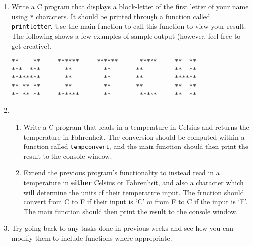 \documentclass{pass}
\begin{document}
\begin{enumerate}[resume]
\item Write a C program that displays a block-letter of the first letter of your name using \texttt{*} characters. It should be printed through a function called \texttt{print\textunderscore letter}. Use the main function to call this function to view your result. The following shows a few examples of sample output (however, feel free to get creative).
\begin{lstlisting}[style=CStyle]
**    **     ******     ******      *****     **  **
***  ***       **         **       **         **  **
********       **         **       **         ******
** ** **       **         **       **         **  **
** ** **     ******       **        *****     **  **
\end{lstlisting}
\item
	\begin{enumerate}
	\item Write a C program that reads in a temperature in Celsius and returns the temperature in Fahrenheit. The conversion should be computed within a function called \texttt{temp\textunderscore convert}, and the main function should then print the result to the console window. \\[6pt]
	\item Extend the previous program's functionality to instead read in a temperature in \textbf{either} Celsius or Fahrenheit, and also a character which will determine the units of their temperature input. The function should convert from C to F if their input is `C' or from F to C if the input is `F'. The main function should then print the result to the console window. \\[6pt]
	\end{enumerate}
	
\item Try going back to any tasks done in previous weeks and see how you can modify them to include functions where appropriate.
	





\end{enumerate}
\end{document}
